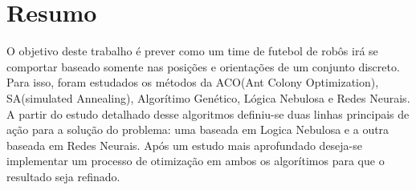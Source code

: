 \section{Resumo}

O objetivo deste trabalho é prever como um time de futebol de robôs irá se comportar baseado
somente nas posições e orientações de um conjunto discreto. Para isso, foram estudados
os métodos da ACO(Ant Colony Optimization), SA(simulated Annealing), Algorítimo  Genético, Lógica Nebulosa
e Redes Neurais. A partir do estudo detalhado desse algoritmos definiu-se duas linhas principais de
ação para a solução do problema: uma baseada em Logica Nebulosa e a outra baseada em Redes Neurais. Após
um estudo mais aprofundado deseja-se implementar um processo de otimização em ambos os algorítimos para
que o resultado seja refinado.
